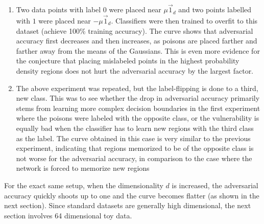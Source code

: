 \documentclass{ociamthesis}
\begin{document}
\begin{enumerate}
    \item Two data points with label $0$ were placed near $\mu\vec{1}_d$ and two
    points labelled with $1$ were placed near $-\mu\vec{1}_d$. Classifiers were
    then trained to overfit to this dataset (achieve 100\% training accuracy).
    The curve shows that adversarial accuracy first decreases and then
    increases, as poisons are placed farther and farther away from the means of
    the Gaussians. This is even more evidence for the conjecture that placing
    mislabeled points in the highest probability density regions does not hurt
    the adversarial accuracy by the largest factor.
    \item The above experiment was repeated, but the label-flipping is done to a
    third, new class. This was to see whether the drop in adversarial accuracy
    primarily stems from learning more complex decision boundaries in the first
    experiment where the poisons were labeled with the opposite class, or the
    vulnerability is equally bad when the classifier has to learn new regions
    with the third class as the label. The curve obtained in this case is very
    similar to the previous experiment, indicating that regions memorized to be
    of the opposite class is not worse for the adversarial accuracy, in
    comparison to the case where the network is forced to memorize new regions
\end{enumerate}

For the exact same setup, when the dimensionality $d$ is increased, the
adversarial accuracy quickly shoots up to one and the curve becomes flatter (as
shown in the next section). Since standard datasets are generally high
dimensional, the next section involves 64 dimensional toy data.

  
   
\end{document}
